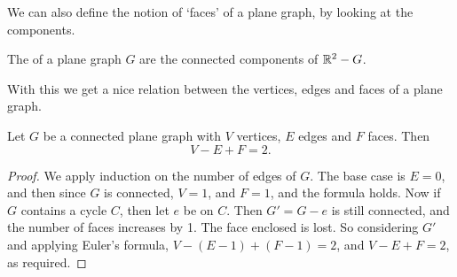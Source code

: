 \documentclass[a4paper]{scrreprt}
\begin{document}
We can also define the notion of `faces' of a plane graph, by looking at the components.

\begin{definition}[Faces]
	The  of a plane graph $G$ are the connected components of $\mathbb{R}^2 - G$.
\end{definition}

With this we get a nice relation between the vertices, edges and faces of a plane graph.

\begin{theorem}
	Let $G$ be a connected plane graph with $V$ vertices, $E$ edges and $F$ faces. Then
	$$
	V - E + F = 2.
	$$
\end{theorem}
\begin{proof}
	We apply induction on the number of edges of $G$. The base case is $E = 0$, and then since $G$ is connected, $V = 1$, and $F = 1$, and the formula holds. 
	Now if $G$ contains a cycle $C$, then let $e$ be on $C$. Then $G' = G - e$ is still connected, and the number of faces increases by 1. The face enclosed is lost. So considering $G'$ and applying Euler's formula, $V - (E - 1) + (F - 1) = 2$, and $V - E + F = 2$, 
	as required.
\end{proof}
\end{document}
